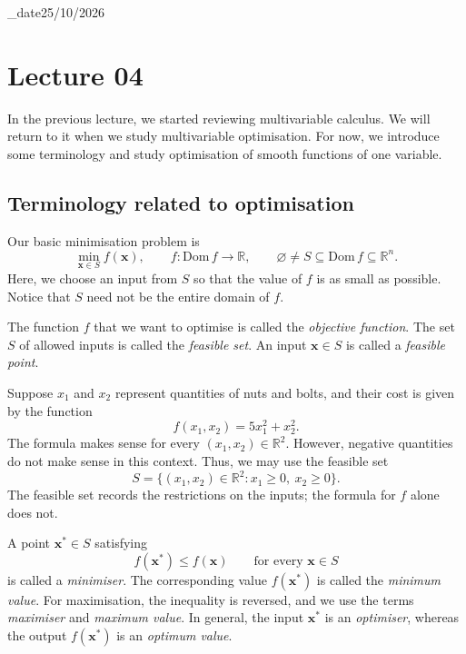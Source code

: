 \lecture_date{25/10/2026}
\chapter{Lecture 04}

In the previous lecture, we started reviewing multivariable calculus. We will return to it when we study multivariable optimisation. For now, we introduce some terminology and study optimisation of smooth functions of one variable.

\section{Terminology related to optimisation}

Our basic minimisation problem is
\begin{equation}
	\min_{\mathbf{x}\in S} f(\mathbf{x}),
	\qquad f:\mathrm{Dom}\,f\to\mathbb{R},
	\qquad \varnothing\neq S\subseteq\mathrm{Dom}\,f\subseteq\mathbb{R}^n.
	\label{eq:lec04-optimisation-problem}
\end{equation}
Here, we choose an input from $S$ so that the value of $f$ is as small as possible. Notice that $S$ need not be the entire domain of $f$.

\begin{definition}
	The function $f$ that we want to optimise is called the \emph{objective function}. The set $S$ of allowed inputs is called the \emph{feasible set}. An input $\mathbf{x}\in S$ is called a \emph{feasible point}.
\end{definition}

\begin{example}
	Suppose $x_1$ and $x_2$ represent quantities of nuts and bolts, and their cost is given by the function
	\[
		f(x_1,x_2)=5x_1^2+x_2^2.
	\]
	The formula makes sense for every $(x_1,x_2)\in\mathbb{R}^2$. However, negative quantities do not make sense in this context. Thus, we may use the feasible set
	\[
		S=\{(x_1,x_2)\in\mathbb{R}^2:x_1\geq0,\ x_2\geq0\}.
	\]
	The feasible set records the restrictions on the inputs; the formula for $f$ alone does not.
\end{example}

\begin{definition}
	A point $\mathbf{x}^*\in S$ satisfying
	\begin{equation}
		f(\mathbf{x}^*)\leq f(\mathbf{x})
		\qquad\text{for every }\mathbf{x}\in S
		\label{eq:lec04-global-minimum}
	\end{equation}
	is called a \emph{minimiser}. The corresponding value $f(\mathbf{x}^*)$ is called the \emph{minimum value}. For maximisation, the inequality is reversed, and we use the terms \emph{maximiser} and \emph{maximum value}. In general, the input $\mathbf{x}^*$ is an \emph{optimiser}, whereas the output $f(\mathbf{x}^*)$ is an \emph{optimum value}.
\end{definition}

